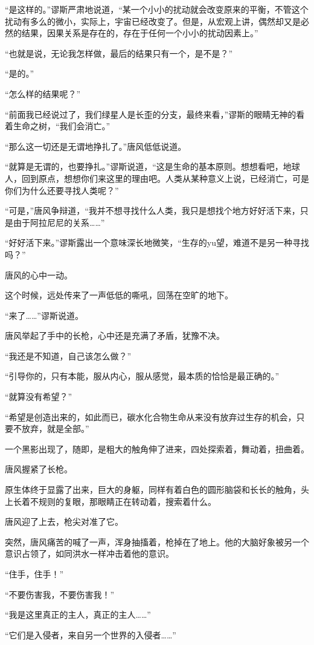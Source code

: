“是这样的。”谬斯严肃地说道，“某一个小小的扰动就会改变原来的平衡，不管这个扰动有多么的微小，实际上，宇宙已经改变了。但是，从宏观上讲，偶然却又是必然的结果，因果关系是存在的，存在于任何一个小小的扰动因素上。”

“也就是说，无论我怎样做，最后的结果只有一个，是不是？”

“是的。”

“怎么样的结果呢？”

“前面我已经说过了，我们绿星人是长歪的分支，最终来看，”谬斯的眼睛无神的看着生命之树，“我们会消亡。”

“那么这一切还是无谓地挣扎了。”唐风低低说道。

“就算是无谓的，也要挣扎。”谬斯说道，“这是生命的基本原则。想想看吧，地球人，回到原点，想想你们来这里的理由吧。人类从某种意义上说，已经消亡，可是你们为什么还要寻找人类呢？”

“可是，”唐风争辩道，“我并不想寻找什么人类，我只是想找个地方好好活下来，只是由于阿拉尼尼的关系……”

“好好活下来。”谬斯露出一个意味深长地微笑，“生存的yu望，难道不是另一种寻找吗？”

唐风的心中一动。


这个时候，远处传来了一声低低的嘶吼，回荡在空旷的地下。

“来了……”谬斯说道。

唐风举起了手中的长枪，心中还是充满了矛盾，犹豫不决。

“我还是不知道，自己该怎么做？”

“引导你的，只有本能，服从内心，服从感觉，最本质的恰恰是最正确的。”

“就算没有希望？”

“希望是创造出来的，如此而已，碳水化合物生命从来没有放弃过生存的机会，只要不放弃，就是全部。”

一个黑影出现了，随即，是粗大的触角伸了进来，四处探索着，舞动着，扭曲着。

唐风握紧了长枪。

原生体终于显露了出来，巨大的身躯，同样有着白色的圆形脑袋和长长的触角，头上长着不规则的复眼，那眼睛正在转动着，搜索着什么。

唐风迎了上去，枪尖对准了它。

突然，唐风痛苦的喊了一声，浑身抽搐着，枪掉在了地上。他的大脑好象被另一个意识占领了，如同洪水一样冲击着他的意识。

“住手，住手！”

“不要伤害我，不要伤害我！”

“我是这里真正的主人，真正的主人……”

“它们是入侵者，来自另一个世界的入侵者……”


